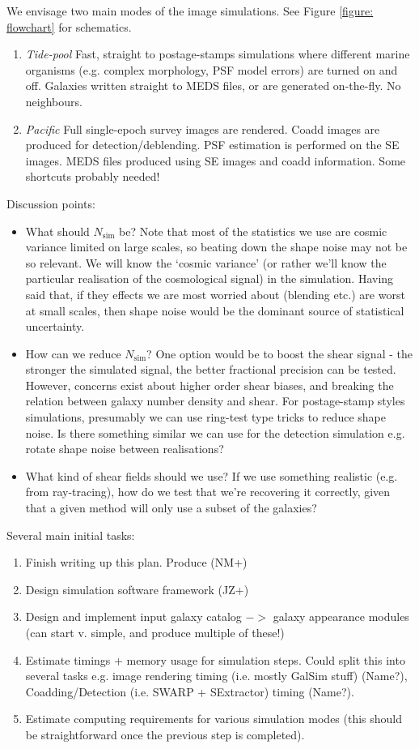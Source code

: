 \documentclass[\docopts]{\docclass}
\begin{document}
We envisage two main modes of the image simulations. See Figure \ref{figure: flowchart} for schematics.
\begin{enumerate}
\item \emph{Tide-pool} Fast, straight to postage-stamps simulations where different marine organisms (e.g. complex morphology, PSF model errors) are turned on and off. Galaxies written straight to MEDS files, or are generated on-the-fly. No neighbours.
\item \emph{Pacific} Full single-epoch survey images are rendered. Coadd images are produced for detection/deblending. PSF estimation is performed on the SE images. MEDS files produced using SE images and coadd information. Some shortcuts probably needed!
\end{enumerate}

Discussion points:
\begin{itemize}
\item{What should $N_{\mathrm{sim}}$ be? Note that most of the statistics we use are cosmic variance limited on large scales, so beating down the shape noise may not be so relevant. We will know the `cosmic variance' (or rather we'll know the particular realisation of the cosmological signal) in the simulation. Having said that, if they effects we are most worried about (blending etc.) are worst at small scales, then shape noise would be the dominant source of statistical uncertainty.}
\item{How can we reduce $N_{\mathrm{sim}}$? One option would be to boost the shear signal - the stronger the simulated signal, the better fractional precision can be tested. However, concerns exist about higher order shear biases, and breaking the relation between galaxy number density and shear. For postage-stamp styles simulations, presumably we can use ring-test type tricks to reduce shape noise. Is there something similar we can use for the detection simulation e.g. rotate shape noise between realisations?}
\item{What kind of shear fields should we use? If we use something realistic (e.g. from ray-tracing), how do we test that we're recovering it correctly, given that a given method will only use a subset of the galaxies?}
\end{itemize}

Several main initial tasks:
\begin{enumerate}
\item{Finish writing up this plan. Produce  (NM+)}
\item{Design simulation software framework (JZ+)}
\item{Design and implement input galaxy catalog 
$->$ galaxy appearance modules (can start v. simple, and produce multiple of these!)}
\item{Estimate timings + memory usage for simulation steps. Could split this into several tasks e.g. image rendering timing (i.e. mostly GalSim stuff) (Name?), Coadding/Detection (i.e. SWARP + SExtractor) timing (Name?).}
\item{Estimate computing requirements for various simulation modes (this should be straightforward once the previous step is completed).}
\end{enumerate}
\end{document}
